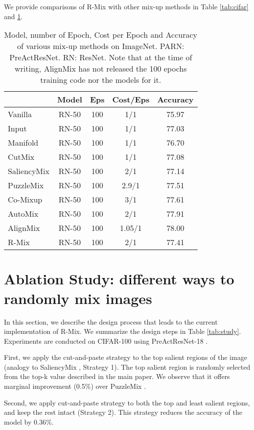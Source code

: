 \documentclass[letterpaper]{article} \usepackage[submission]{aaai23}  \usepackage{times}  \usepackage{helvet}  \usepackage{courier}  \usepackage[hyphens]{url}  \usepackage{graphicx} \urlstyle{rm} \def\UrlFont{\rm}  \usepackage{natbib}  \usepackage{caption} \frenchspacing  \setlength{\pdfpagewidth}{8.5in} \setlength{\pdfpageheight}{11in}
\newcommand{\rrlmix}{{R-Mix}}
\begin{document}
We provide comparisons of \rrlmix{} with other mix-up methods in Table \ref{tab:cifar} and \ref{tab:imagenet}. 

\begin{table}[h!]
\centering
\begin{tabular}{lcccc}
\hline 
 & Model & Eps & Cost/Eps & Accuracy \\ \hline 
Vanilla & RN-50 & 100 & 1/1 & 75.97 \\
Input & RN-50 & 100 & 1/1 & 77.03 \\
Manifold & RN-50 & 100 & 1/1 & 76.70 \\
CutMix & RN-50 & 100 & 1/1 & 77.08 \\
SaliencyMix & RN-50 & 100 & 2/1 & 77.14 \\
PuzzleMix & RN-50 & 100 & 2.9/1 & 77.51 \\
Co-Mixup & RN-50 & 100 & 3/1 & 77.61 \\
AutoMix & RN-50 & 100 & 2/1 & 77.91 \\
AlignMix & RN-50 & 100 & 1.05/1 & 78.00 \\ \hline 
R-Mix & RN-50 & 100 & 2/1 & 77.41 \\ \hline 
\end{tabular}
\caption{Model, number of Epoch, Cost per Epoch and Accuracy of various mix-up methods on ImageNet. PARN: PreActResNet. RN: ResNet. Note that at the time of writing, AlignMix has not released the 100 epochs training code nor the models for it.}
\label{tab:imagenet}
\end{table}

\section*{Ablation Study: different ways to randomly mix images}
In this section, we describe the design process that leads to the current implementation of R-Mix. We summarize the design steps in Table \ref{tab:study}. Experiments are conducted on CIFAR-100 \cite{Krizhevsky09cifar100} using PreActResNet-18 \cite{he2016preact}.

First, we apply the cut-and-paste strategy to the top salient regions of the image (analogy to SaliencyMix \cite{uddin2021saliencymix}, Strategy 1). The top salient region is randomly selected from the top-k value described in the main paper. We observe that it offers marginal improvement (0.5\%) over PuzzleMix \cite{kim2020puzzlemix}.

Second, we apply cut-and-paste strategy to both the top and least salient regions, and keep the rest intact (Strategy 2). This strategy reduces the accuracy of the model by 0.36\%.
\end{document}
